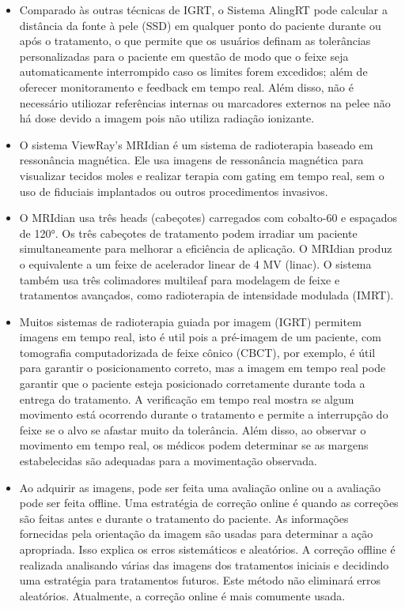 \documentclass[11pt,a4paper]{article}
\newcounter{exemplo}
\begin{document}
\begin{exemplo}[IGRT]
\begin{itemize}
        \item Comparado às outras técnicas de IGRT, o Sistema AlingRT pode calcular a distância da fonte à pele (SSD) em qualquer ponto do paciente durante ou após o tratamento, o que permite que os usuários definam as tolerâncias personalizadas para o paciente em questão de modo que o feixe seja automaticamente interrompido caso os limites forem excedidos; além de oferecer monitoramento e feedback em tempo real. Além disso,  não é necessário utiliozar referências internas ou marcadores externos na pelee não há dose devido a imagem pois não utiliza radiação ionizante.
        
        \item O sistema ViewRay's MRIdian é um sistema de radioterapia baseado em ressonância magnética. Ele usa imagens de ressonância magnética para visualizar tecidos moles e realizar terapia com gating em tempo real, sem o uso de fiduciais implantados ou outros procedimentos invasivos.
        
        \item O MRIdian usa três heads (cabeçotes) carregados com cobalto-60 e espaçados de 120°. Os três cabeçotes de tratamento podem irradiar um paciente simultaneamente para melhorar a eficiência de aplicação. O MRIdian produz o equivalente a um feixe de acelerador linear de 4 MV (linac). O sistema também usa três colimadores multileaf para modelagem de feixe e tratamentos avançados, como radioterapia de intensidade modulada (IMRT).
        
        \item Muitos sistemas de radioterapia guiada por imagem (IGRT) permitem imagens em tempo real, isto é util pois a pré-imagem de um paciente, com tomografia computadorizada de feixe cônico (CBCT), por exemplo, é útil para garantir o posicionamento correto, mas a imagem em tempo real pode garantir que o paciente esteja posicionado corretamente durante toda a entrega do tratamento. A verificação em tempo real mostra se algum movimento está ocorrendo durante o tratamento e permite a interrupção do feixe se o alvo se afastar muito da tolerância. Além disso, ao observar o movimento em tempo real, os médicos podem determinar se as margens estabelecidas são adequadas para a movimentação observada.
        
        \item Ao adquirir as imagens, pode ser feita uma avaliação online ou a avaliação pode ser feita offline. Uma estratégia de correção online é quando as correções são feitas antes e durante o tratamento do paciente. As informações fornecidas pela orientação da imagem são usadas para determinar a ação apropriada. Isso explica os erros sistemáticos e aleatórios. A correção offline é realizada analisando várias das imagens dos tratamentos iniciais e decidindo uma estratégia para tratamentos futuros. Este método não eliminará erros aleatórios. Atualmente, a correção online é mais comumente usada.

    \end{itemize}
\end{exemplo}
   

\end{document}

